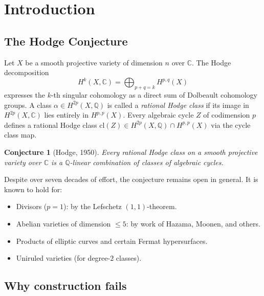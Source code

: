 \documentclass[aps,prd,twocolumn,superscriptaddress,nofootinbib]{revtex4-2}
\newtheorem{conjecture}[theorem]{Conjecture}
\theoremstyle{definition}
\theoremstyle{remark}
\begin{document}
\maketitle


\section{Introduction}
\label{sec:intro}

\subsection{The Hodge Conjecture}

Let $X$ be a smooth projective variety of dimension $n$ over $\mathbb{C}$. The Hodge decomposition
\begin{equation}
H^k(X, \mathbb{C}) = \bigoplus_{p+q=k} H^{p,q}(X)
\label{eq:hodge_decomp}
\end{equation}
expresses the $k$-th singular cohomology as a direct sum of Dolbeault cohomology groups. A class $\alpha \in H^{2p}(X, \mathbb{Q})$ is called a \textit{rational Hodge class} if its image in $H^{2p}(X, \mathbb{C})$ lies entirely in $H^{p,p}(X)$. Every algebraic cycle $Z$ of codimension $p$ defines a rational Hodge class $\mathrm{cl}(Z) \in H^{2p}(X, \mathbb{Q}) \cap H^{p,p}(X)$ via the cycle class map.

\begin{conjecture}[Hodge, 1950]
\label{conj:hodge}
Every rational Hodge class on a smooth projective variety over $\mathbb{C}$ is a $\mathbb{Q}$-linear combination of classes of algebraic cycles.
\end{conjecture}

Despite over seven decades of effort, the conjecture remains open in general. It is known to hold for:
\begin{itemize}
\item Divisors ($p = 1$): by the Lefschetz $(1,1)$-theorem.
\item Abelian varieties of dimension $\leq 5$: by work of Hazama, Moonen, and others.
\item Products of elliptic curves and certain Fermat hypersurfaces.
\item Uniruled varieties (for degree-$2$ classes).
\end{itemize}

\subsection{Why construction fails}
\end{document}
